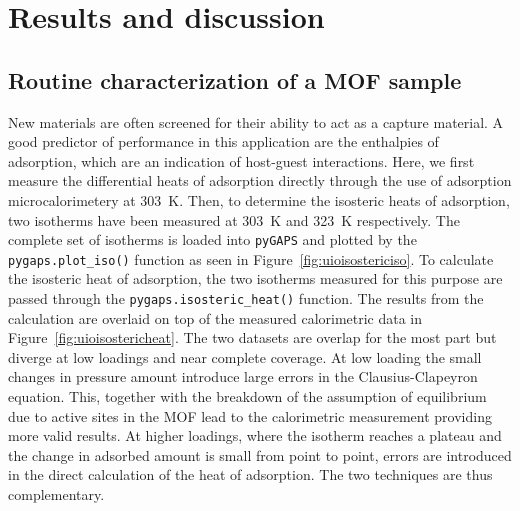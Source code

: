 
\section{Results and discussion}


\subsection{Routine characterization of a MOF sample}




New materials are often screened for their ability to act as a  capture material. 
A good predictor of performance 
in this application are the enthalpies of adsorption, which are an indication of
host-guest interactions. Here, we first measure the differential heats of adsorption
directly through the use of adsorption microcalorimetery at \SI{303}{\kelvin}. 
Then, to determine the isosteric heats of adsorption,
two isotherms have been measured at \SI{303}{\kelvin} and \SI{323}{\kelvin} respectively. 
The complete set of isotherms is loaded into \texttt{pyGAPS} and plotted by the 
\lstinline{pygaps.plot_iso()} function as seen in Figure~\ref{fig:uioisostericiso}. 
To calculate the isosteric heat
of adsorption, the two isotherms measured for this purpose are passed through the 
\lstinline{pygaps.isosteric_heat()} function. The results from the calculation are overlaid 
on top of the measured calorimetric data in 
Figure~\ref{fig:uioisostericheat}. The two datasets are
overlap for the most part but diverge at low loadings and near complete coverage.
At low loading the small changes in pressure amount introduce large errors in the 
Clausius-Clapeyron equation. This, together with the breakdown of the 
assumption of equilibrium due to active sites in the MOF lead to the calorimetric
measurement providing more valid results. At higher loadings, where the isotherm reaches
a plateau and the change in adsorbed amount is small from point to point, errors are
introduced in the direct calculation of the heat of adsorption. The two techniques are thus 
complementary.  

